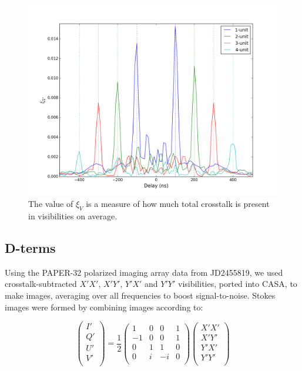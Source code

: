 \documentclass[10pt,a4paper,notitlepage]{article}
\begin{document}
\begin{figure}
\centering
\includegraphics[scale=0.5]{xi_V-zoom.png}
\caption{The value of $\xi_V$ is a measure of how much total crosstalk is present in visibilities on average.}
\label{fig:xi_V}
\end{figure}

\subsection{D-terms}

Using the PAPER-32 polarized imaging array data from JD2455819, we used crosstalk-subtracted $X'X'$, $X'Y'$, $Y'X'$ and $Y'Y'$ visibilities, ported into CASA, to make images, averaging over all frequencies to boost signal-to-noise. Stokes images were formed by combining images according to:

\begin{equation}
\begin{pmatrix}
I' \\
Q' \\
U' \\
V' \\
\end{pmatrix}
=\frac{1}{2}
\begin{pmatrix}
1 & 0 & 0 & 1 \\
-1& 0 & 0 & 1 \\
0 & 1 & 1 & 0 \\
0 & i & -i & 0 \\
\end{pmatrix}
\begin{pmatrix}
X'X' \\
X'Y' \\
Y'X' \\
Y'Y' \\
\end{pmatrix}
\end{equation}
\end{document}
